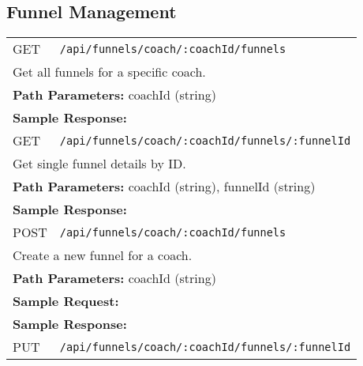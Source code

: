 \documentclass[11pt,a4paper]{article}
\begin{document}
\subsection{Funnel Management}
\begin{longtable}{p{2.5cm}p{10cm}}
GET & \texttt{/api/funnels/coach/:coachId/funnels} \\
\multicolumn{2}{p{13cm}}{Get all funnels for a specific coach.} \\
\multicolumn{2}{p{13cm}}{\textbf{Path Parameters:} coachId (string)} \\
\multicolumn{2}{p{13cm}}{\textbf{Sample Response:}}
\begin{lstlisting}[language=json]
{"success": true, "data": [{"id": "64f1a2b3c4d5e6f7a8b9c0d1", "name": "My Funnel", "description": "Demo", "funnelUrl": "coach-1/demo-funnel"}]}
\end{lstlisting} \\
GET & \texttt{/api/funnels/coach/:coachId/funnels/:funnelId} \\
\multicolumn{2}{p{13cm}}{Get single funnel details by ID.} \\
\multicolumn{2}{p{13cm}}{\textbf{Path Parameters:} coachId (string), funnelId (string)} \\
\multicolumn{2}{p{13cm}}{\textbf{Sample Response:}}
\begin{lstlisting}[language=json]
{"success": true, "data": {"id": "64f1a2b3c4d5e6f7a8b9c0d1", "name": "My Funnel", "stages": [], "analytics": {}}}
\end{lstlisting} \\
POST & \texttt{/api/funnels/coach/:coachId/funnels} \\
\multicolumn{2}{p{13cm}}{Create a new funnel for a coach.} \\
\multicolumn{2}{p{13cm}}{\textbf{Path Parameters:} coachId (string)} \\
\multicolumn{2}{p{13cm}}{\textbf{Sample Request:}}
\begin{lstlisting}[language=json]
{"name":"My Funnel","description":"Demo","funnelUrl":"coach-1/demo-funnel","targetAudience":"customer","stages":[]}
\end{lstlisting} \\
\multicolumn{2}{p{13cm}}{\textbf{Sample Response:}}
\begin{lstlisting}[language=json]
{"success": true, "data": {"id": "64f1a2b3c4d5e6f7a8b9c0d1", "name": "My Funnel"}}
\end{lstlisting} \\
PUT & \texttt{/api/funnels/coach/:coachId/funnels/:funnelId} \\

\end{longtable}
\end{document}
